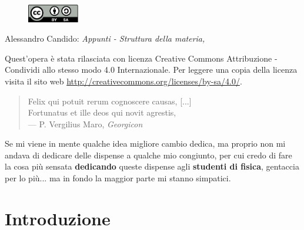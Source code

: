 \thispagestyle{empty}

\hfill

\vfill

\begin{figure}
	\centering
	\includegraphics[width=0.2\textwidth]{Licenza/by-sa.pdf}
\end{figure}

\noindent Alessandro Candido: \textit{Appunti - Struttura della materia,}
\textcopyleft\ \DTMMonthname{\the\month} \the\year
\newline

Quest'opera è stata rilasciata con licenza Creative Commons Attribuzione - Condividi allo stesso modo 4.0 Internazionale. Per leggere una copia della licenza visita il sito web \href{http://creativecommons.org/licenses/by-sa/4.0/}{http://creativecommons.org/licenses/by-sa/4.0/}.

\setcounter{tocdepth}{2}
\tableofcontents
\markboth{\scshape{\contentsname}}{\scshape{\contentsname}}

\clearpage
{}
\thispagestyle{empty}

\vspace*{3cm}

\begin{quote}
	Felix qui potuit rerum cognoscere causas, [...] \\
	Fortunatus et ille deos qui novit agrestis, \\ \medskip
	--- P. Vergilius Maro, \textit{Georgicon}
\end{quote}

\medskip

\begin{center}
	Se mi viene in mente qualche idea migliore cambio dedica, ma proprio non mi andava di dedicare delle dispense a qualche mio congiunto, per cui credo di fare la cosa più sensata \textbf{dedicando} queste dispense agli \textbf{studenti di fisica}, gentaccia per lo più... ma in fondo la maggior parte mi stanno simpatici.
\end{center}


\chapter*{Introduzione}

